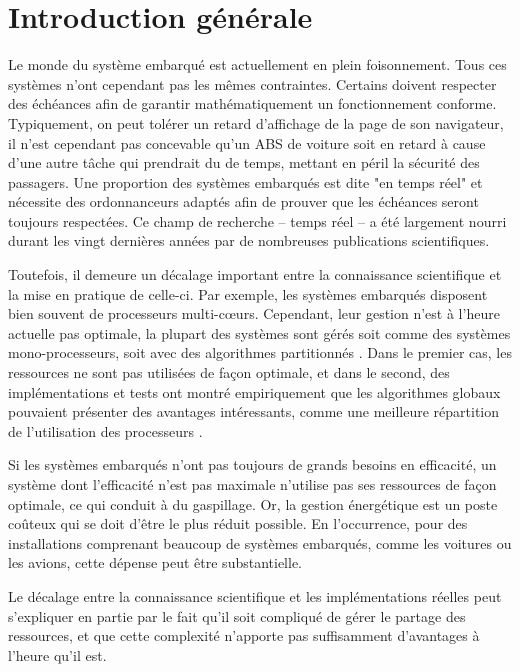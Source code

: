 	\section{Introduction générale}
	Le monde du système embarqué est actuellement en plein foisonnement. 
	Tous ces systèmes n'ont cependant pas les mêmes contraintes. 
	Certains doivent respecter des échéances afin de garantir mathématiquement
	un fonctionnement conforme. Typiquement, on peut tolérer 
	un retard d'affichage de la page de son navigateur, il n'est cependant pas 
	concevable qu'un ABS de voiture soit en retard à cause d'une autre tâche 
	qui prendrait du de temps, mettant en péril la sécurité des passagers.
	Une proportion des systèmes embarqués est dite "en temps réel" et nécessite des 
	ordonnanceurs adaptés afin de prouver que les échéances seront toujours respectées.
	Ce champ de recherche -- temps réel -- a été largement nourri durant les vingt dernières années par de nombreuses publications scientifiques. \medskip
	
	Toutefois, il demeure un décalage important entre la connaissance scientifique et 
	la mise en pratique de celle-ci. 
	Par exemple, les systèmes embarqués disposent bien souvent de processeurs multi-c\oe{}urs.
	Cependant, leur gestion n'est à l'heure actuelle pas optimale, la plupart des systèmes sont  
	gérés soit comme des systèmes mono-processeurs, soit avec des algorithmes partitionnés \cite{paolillo_new_nodate}. 
	Dans le premier cas, les ressources ne sont pas utilisées de façon optimale, 
	et dans le second, des implémentations et tests ont montré empiriquement 
	que les algorithmes globaux pouvaient présenter des avantages intéressants, comme 
	une meilleure répartition de l'utilisation des processeurs \cite{baker_analysis_2005}. 
	\medskip	
	
	Si les systèmes embarqués n'ont pas toujours de grands 
	besoins en efficacité, un système dont l'efficacité n'est pas maximale n'utilise pas 
	ses ressources de façon optimale, ce qui conduit à du gaspillage. 
	Or, la gestion énergétique est un poste coûteux qui se doit d'être le plus réduit possible. 
	En l'occurrence, pour des installations comprenant beaucoup de systèmes embarqués, 
	comme les voitures ou les avions, cette dépense peut être substantielle. \medskip
	
	Le décalage entre la connaissance scientifique et les implémentations réelles 
	peut s'expliquer en partie par le fait qu'il soit compliqué de gérer le partage des ressources, 
	et que cette complexité n'apporte pas suffisamment d'avantages à l'heure qu'il est.\medskip
	
